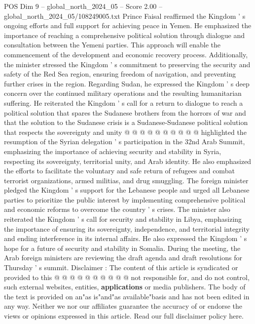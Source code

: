 \begin{textsample}{POS Dim 9 – global\_north\_2024\_05 – Score 2.00 – global\_north\_2024\_05/108249005.txt}
Prince Faisal reaffirmed the Kingdom ' s ongoing efforts and full support for achieving peace in Yemen.
He emphasized the importance of reaching a comprehensive political solution through dialogue and consultation between the Yemeni parties.
This approach will enable the commencement of the development and economic recovery process.
Additionally, the minister stressed the Kingdom ' s commitment to preserving the security and safety of the Red Sea region, ensuring freedom of navigation, and preventing further crises in the region.
Regarding Sudan, he expressed the Kingdom ' s deep concern over the continued military operations and the resulting humanitarian suffering.
He reiterated the Kingdom ' s call for a return to dialogue to reach a political solution that spares the Sudanese brothers from the horrors of war and that the solution to the Sudanese crisis is a Sudanese-Sudanese political solution that respects the sovereignty and unity @ @ @ @ @ @ @ @ @ @ highlighted the resumption of the Syrian delegation ' s participation in the 32nd Arab Summit, emphasizing the importance of achieving security and stability in Syria, respecting its sovereignty, territorial unity, and Arab identity.
He also emphasized the efforts to facilitate the voluntary and safe return of refugees and combat terrorist organizations, armed militias, and drug smuggling.
The foreign minister pledged the Kingdom ' s support for the Lebanese people and urged all Lebanese parties to prioritize the public interest by implementing comprehensive political and economic reforms to overcome the country ' s crises.
The minister also reiterated the Kingdom ' s call for security and stability in Libya, emphasizing the importance of ensuring its sovereignty, independence, and territorial integrity and ending interference in its internal affairs.
He also expressed the Kingdom ' s hope for a future of security and stability in Somalia.
During the meeting, the Arab foreign ministers are reviewing the draft agenda and draft resolutions for Thursday ' s summit.
Disclaimer : The content of this article is syndicated or provided to this @ @ @ @ @ @ @ @ @ @ not responsible for, and do not control, such external websites, entities, \textbf{applications} or media publishers.
The body of the text is provided on an"as is"and"as available"basis and has not been edited in any way.
Neither we nor our affiliates guarantee the accuracy of or endorse the views or opinions expressed in this article.
Read our full disclaimer policy here.

\end{textsample}

